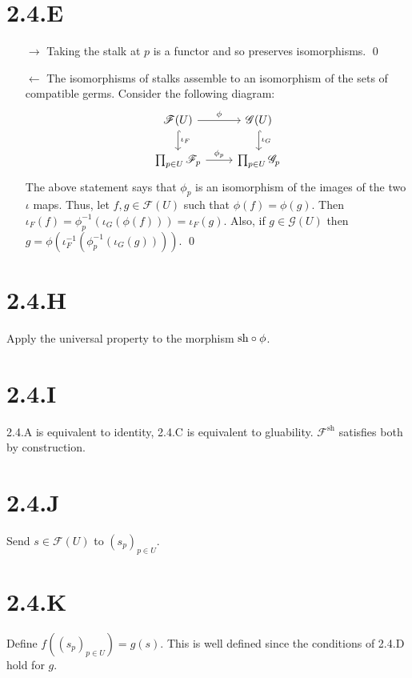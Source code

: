 \documentclass{article}
\begin{document}
\section*{2.4.E}
\begin{itemize}
    \item[$\rightarrow$] Taking the stalk at $p$ is a functor and so preserves
        isomorphisms. \qed
    \item[$\leftarrow$] The isomorphisms of stalks assemble to an isomorphism of the sets of compatible
        germs. Consider the following diagram: \[
            \begin{tikzcd}
                \mathscr{F}(U) \ar[r, "\phi"] \ar[d, hook, "\iota_F"]
                 & \mathscr{G}(U) \ar[d, hook, "\iota_G"] \\
                \prod_{p \in U} \mathscr{F}_p \ar[r, "\phi_p"]
                 & \prod_{p \in U} \mathscr{G}_p
            \end{tikzcd}
        \] The above
        statement says that $\phi_p$ is an isomorphism of the images of
        the two $\iota$ maps. Thus, let $f, g \in \mathscr{F}(U)$ such that
        $\phi(f)=\phi(g)$. Then $\iota_F(f)=\phi^{-1}_p(\iota_G(\phi(f)))=\iota_F(g)$. Also, if
        $g \in \mathscr{G}(U)$ then $g=\phi(\iota_F^{-1}(\phi_p^{-1}(\iota_G(g))))$. \qed
\end{itemize}

\section*{2.4.H}
Apply the universal property to the morphism $\text{sh} \circ \phi$.

\section*{2.4.I}
2.4.A is equivalent to identity, 2.4.C is equivalent to gluability.
$\mathscr{F}^{\text{sh}}$ satisfies both by construction.

\section*{2.4.J}
Send $s \in \mathscr{F}(U)$ to $(s_p)_{p \in U}$.

\section*{2.4.K}
Define $f((s_p)_{p \in U})=g(s)$. This is well defined since the conditions of
2.4.D hold for $g$.
\end{document}
